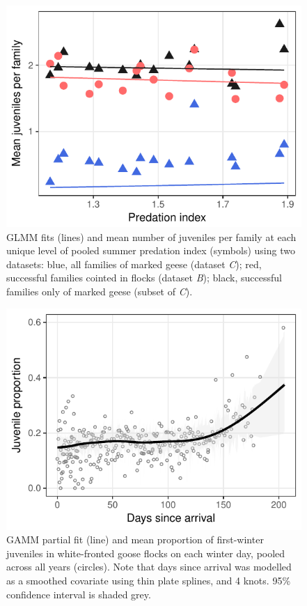 \documentclass[10pt,twocolumn]{paper}
\begin{document}
\begin{figure}[H]
\includegraphics[width = 1\linewidth]{fam_predation.pdf}
\caption{{\small GLMM fits (lines) and mean number of juveniles per family at each
unique level of pooled summer predation index (symbols) using two
datasets: blue, all families of marked geese (dataset \emph{C}); red,
successful families cointed in flocks (dataset \emph{B}); black,
successful families only of marked geese (subset of \emph{C}).}}
\end{figure}

\begin{figure}[H]
\includegraphics[width = 1\linewidth]{juvprop_time.pdf}
\caption{{\small GAMM partial fit (line) and mean proportion of first-winter juveniles in
white-fronted goose flocks on each winter day, pooled across all years
(circles). Note that days since arrival was modelled as a smoothed
covariate using thin plate splines, and 4 knots. 95\% confidence interval is shaded grey.}}
\end{figure}
\end{document}
